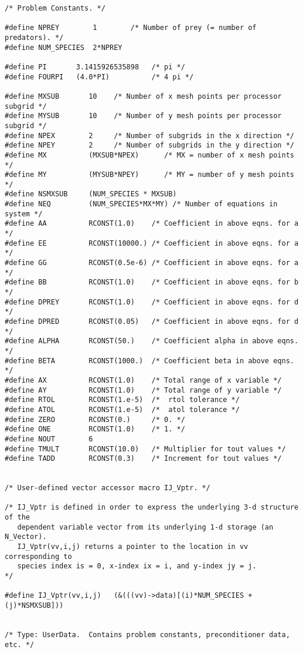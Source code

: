 \documentclass[11pt]{article}
\begin{document}
\begin{verbatim}
/* Problem Constants. */

#define NPREY        1        /* Number of prey (= number of predators). */
#define NUM_SPECIES  2*NPREY

#define PI       3.1415926535898   /* pi */ 
#define FOURPI   (4.0*PI)          /* 4 pi */

#define MXSUB       10    /* Number of x mesh points per processor subgrid */
#define MYSUB       10    /* Number of y mesh points per processor subgrid */
#define NPEX        2     /* Number of subgrids in the x direction */
#define NPEY        2     /* Number of subgrids in the y direction */
#define MX          (MXSUB*NPEX)      /* MX = number of x mesh points */
#define MY          (MYSUB*NPEY)      /* MY = number of y mesh points */
#define NSMXSUB     (NUM_SPECIES * MXSUB)
#define NEQ         (NUM_SPECIES*MX*MY) /* Number of equations in system */
#define AA          RCONST(1.0)    /* Coefficient in above eqns. for a */
#define EE          RCONST(10000.) /* Coefficient in above eqns. for a */
#define GG          RCONST(0.5e-6) /* Coefficient in above eqns. for a */
#define BB          RCONST(1.0)    /* Coefficient in above eqns. for b */
#define DPREY       RCONST(1.0)    /* Coefficient in above eqns. for d */
#define DPRED       RCONST(0.05)   /* Coefficient in above eqns. for d */
#define ALPHA       RCONST(50.)    /* Coefficient alpha in above eqns. */
#define BETA        RCONST(1000.)  /* Coefficient beta in above eqns. */
#define AX          RCONST(1.0)    /* Total range of x variable */
#define AY          RCONST(1.0)    /* Total range of y variable */
#define RTOL        RCONST(1.e-5)  /*  rtol tolerance */
#define ATOL        RCONST(1.e-5)  /*  atol tolerance */
#define ZERO        RCONST(0.)     /* 0. */
#define ONE         RCONST(1.0)    /* 1. */
#define NOUT        6  
#define TMULT       RCONST(10.0)   /* Multiplier for tout values */
#define TADD        RCONST(0.3)    /* Increment for tout values */


/* User-defined vector accessor macro IJ_Vptr. */

/* IJ_Vptr is defined in order to express the underlying 3-d structure of the 
   dependent variable vector from its underlying 1-d storage (an N_Vector).
   IJ_Vptr(vv,i,j) returns a pointer to the location in vv corresponding to 
   species index is = 0, x-index ix = i, and y-index jy = j.                */

#define IJ_Vptr(vv,i,j)   (&(((vv)->data)[(i)*NUM_SPECIES + (j)*NSMXSUB]))


/* Type: UserData.  Contains problem constants, preconditioner data, etc. */


\end{verbatim}
\end{document}
